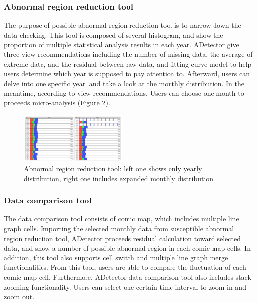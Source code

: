 \documentclass{vgtc}                          %
\begin{document}
\subsubsection{Abnormal region reduction tool}

The purpose of possible abnormal region reduction tool is to narrow down the data checking. This tool is composed of several histogram, and show the proportion of multiple statistical analysis results in each year. ADetector give three view recommendations including the number of missing data, the average of extreme data, and the residual between raw data, and fitting curve model to help users determine which year is supposed to pay attention to. Afterward, users can delve into one specific year, and take a look at the monthly distribution. In the meantime, according to view recommendations. Users can choose one month to proceeds micro-analysis (Figure 2).

\begin{figure}[htb]
	\centering
	\includegraphics[width=0.47\textwidth]{region.png}
	\caption{Abnormal region reduction tool: left one shows only yearly distribution, right one includes expanded monthly distribution}
\end{figure}

\subsubsection{Data comparison tool}

The data comparison tool consists of comic map, which includes multiple line graph cells. Importing the selected monthly data from susceptible abnormal region reduction tool, ADetector proceeds residual calculation toward selected data, and show a number of possible abnormal region in each comic map cells. In addition, this tool also supports cell switch and multiple line graph merge functionalities. From this tool, users are able to compare the fluctuation of each comic map cell. Furthermore, ADetector data comparison tool also includes stack zooming functionality. Users can select one certain time interval to zoom in and zoom out. 

\end{document}
